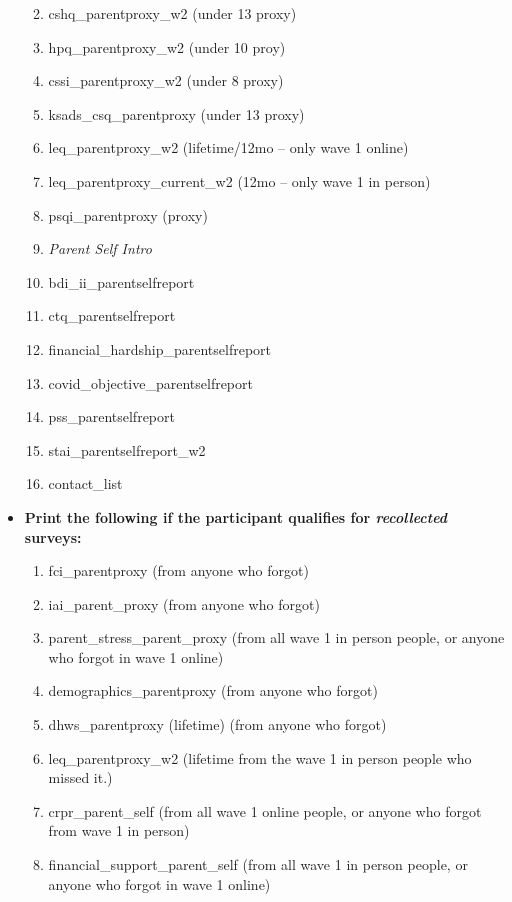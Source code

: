 \documentclass[
]{book}
\providecommand{\tightlist}{%
  \setlength{\itemsep}{0pt}\setlength{\parskip}{0pt}}
\begin{document}
\begin{itemize}
  \begin{enumerate}
  \def\labelenumi{\arabic{enumi}.}
  \setcounter{enumi}{16}
  \tightlist
  \item
    cshq\_parentproxy\_w2 (under 13 proxy)
  \item
    hpq\_parentproxy\_w2 (under 10 proy)
  \item
    cssi\_parentproxy\_w2 (under 8 proxy)
  \item
    ksads\_csq\_parentproxy (under 13 proxy)
  \item
    leq\_parentproxy\_w2 (lifetime/12mo -- only wave 1 online)
  \item
    leq\_parentproxy\_current\_w2 (12mo -- only wave 1 in person)
  \item
    psqi\_parentproxy (proxy)
  \item
    \emph{Parent Self Intro}
  \item
    bdi\_ii\_parentselfreport
  \item
    ctq\_parentselfreport
  \item
    financial\_hardship\_parentselfreport
  \item
    covid\_objective\_parentselfreport
  \item
    pss\_parentselfreport
  \item
    stai\_parentselfreport\_w2
  \item
    contact\_list
  \end{enumerate}
\item
  \textbf{Print the following if the participant qualifies for \emph{recollected} surveys:}

  \begin{enumerate}
  \def\labelenumi{\arabic{enumi}.}
  \setcounter{enumi}{31}
  \tightlist
  \item
    fci\_parentproxy (from anyone who forgot)
  \item
    iai\_parent\_proxy (from anyone who forgot)
  \item
    parent\_stress\_parent\_proxy (from all wave 1 in person people, or anyone who forgot in wave 1 online)\\
  \item
    demographics\_parentproxy (from anyone who forgot)
  \item
    dhws\_parentproxy (lifetime) (from anyone who forgot)
  \item
    leq\_parentproxy\_w2 (lifetime from the wave 1 in person people who missed it.)
  \item
    crpr\_parent\_self (from all wave 1 online people, or anyone who forgot from wave 1 in person)\\
  \item
    financial\_support\_parent\_self (from all wave 1 in person people, or anyone who forgot in wave 1 online)
  \end{enumerate}


\end{itemize}
\end{document}
